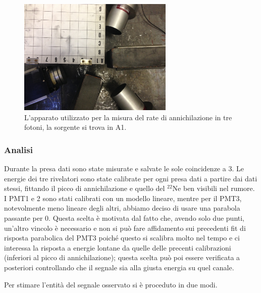
 \begin{figure}[h]
	\centering
	\includegraphics[width=20em]{immagini/3gamma_foto}
	\caption{\label{fig:3gamma_signal} L'apparato utilizzato per la misura del rate di annichilazione in tre fotoni, la sorgente si trova in A1.}
	\label{fig:foto_3gamma}
\end{figure}

\subsubsection{Analisi}
Durante la presa dati sono state misurate e salvate le sole coincidenze a 3. Le energie dei tre rivelatori sono state calibrate per ogni presa dati a partire dai dati stessi, fittando il picco di annichilazione e quello del $^{22}\text{Ne}$ ben visibili nel rumore. I PMT1 e 2 sono stati calibrati con un modello lineare, mentre per il PMT3, notevolmente meno lineare degli altri, abbiamo deciso di usare una parabola passante per 0. Questa scelta è motivata dal fatto che, avendo solo due punti, un'altro vincolo è necessario e non si può fare affidamento sui precedenti fit di risposta parabolica del PMT3 poiché questo si scalibra molto nel tempo e ci interessa la risposta a energie lontane da quelle delle precenti calibrazioni (inferiori al picco di annichilazione); questa scelta può poi essere verificata a posteriori controllando che il segnale sia alla giusta energia su quel canale.

Per stimare l'entità del segnale osservato si è proceduto in due modi.
